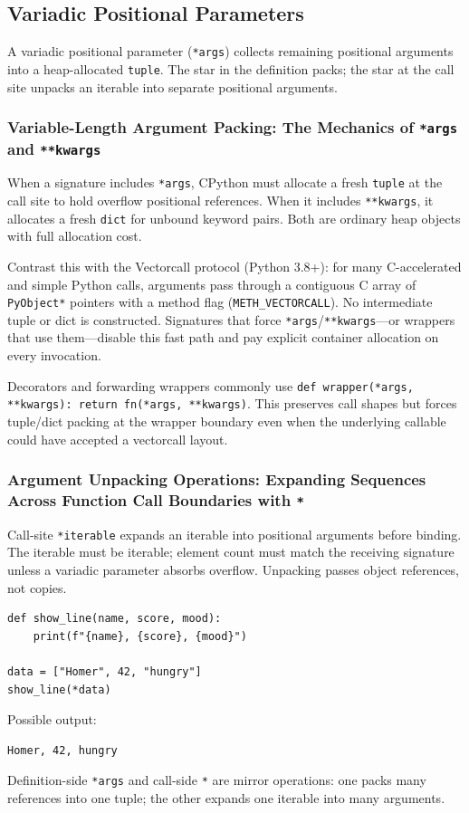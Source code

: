 \subsection{Variadic Positional Parameters}

A variadic positional parameter (\texttt{*args}) collects remaining positional arguments into a heap-allocated \texttt{tuple}. The star in the definition packs; the star at the call site unpacks an iterable into separate positional arguments.

\subsubsection{Variable-Length Argument Packing: The Mechanics of \texttt{*args} and \texttt{**kwargs}}

When a signature includes \texttt{*args}, CPython must allocate a fresh \texttt{tuple} at the call site to hold overflow positional references. When it includes \texttt{**kwargs}, it allocates a fresh \texttt{dict} for unbound keyword pairs. Both are ordinary heap objects with full allocation cost.

Contrast this with the Vectorcall protocol (Python 3.8+): for many C-accelerated and simple Python calls, arguments pass through a contiguous C array of \texttt{PyObject*} pointers with a method flag (\texttt{METH\_VECTORCALL}). No intermediate tuple or dict is constructed. Signatures that force \texttt{*args}/\texttt{**kwargs}---or wrappers that use them---disable this fast path and pay explicit container allocation on every invocation.



Decorators and forwarding wrappers commonly use \texttt{def wrapper(*args, **kwargs): return fn(*args, **kwargs)}. This preserves call shapes but forces tuple/dict packing at the wrapper boundary even when the underlying callable could have accepted a vectorcall layout.

\subsubsection{Argument Unpacking Operations: Expanding Sequences Across Function Call Boundaries with \texttt{*}}

Call-site \texttt{*iterable} expands an iterable into positional arguments before binding. The iterable must be iterable; element count must match the receiving signature unless a variadic parameter absorbs overflow. Unpacking passes object references, not copies.

\begin{verbatim}
def show_line(name, score, mood):
    print(f"{name}, {score}, {mood}")

data = ["Homer", 42, "hungry"]
show_line(*data)
\end{verbatim}

Possible output:

\begin{verbatim}
Homer, 42, hungry
\end{verbatim}

Definition-side \texttt{*args} and call-side \texttt{*} are mirror operations: one packs many references into one tuple; the other expands one iterable into many arguments.
